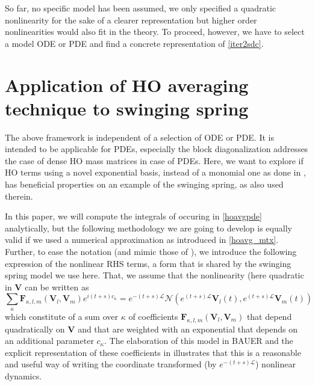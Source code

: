 \documentclass[a4,12pt]{article}
\newcommand{\V}{\mathbf{V}}
\newcommand{\Fu}{\mathbf{F}}
\newcommand{\opL}{\mathcal{L}}
\newcommand{\opN}{\mathcal{N}}
\begin{document}
So far, no specific model has been assumed, we only specified a quadratic nonlinearity for the sake of a clearer representation but higher order nonlinearities would also fit in the theory. To proceed, however, we have to select a model ODE or PDE and find a concrete representation of \eqref{iter2sdc}.


\section{Application of HO averaging technique to swinging spring}

The above framework is independent of a selection of ODE or PDE. It is intended to be applicable for PDEs, especially the block diagonalization addresses the case of dense HO mass matrices in case of PDEs. Here, we want to explore if HO terms using a novel exponential basis, instead of a monomial one as done in \cite{Bauer22}, has beneficial properties on an example of the swinging spring, as also used therein.

In this paper, we will compute the integrals of occuring in \eqref{hoavgpde} analytically, but the following methodology we are going to develop is equally valid if we used a numerical approximation as introduced in \eqref{hoavg_mtx}. Further, to ease the notation (and mimic those of \cite{Bauer22}), we introduce the following expression of the nonlinear RHS terms, a form that is shared by the swinging spring model we use here. That, we assume that the nonlinearity (here quadratic in $\V$ can be written as
\begin{equation}
 \sum_{\kappa} \Fu_{\kappa,l,m}(\V_l,\V_m) e^{i {(t + s) c_\kappa} }
  =   e^{-(t+s) \opL} \opN \left(e^{ (t+s) \opL}  {\V_{l}}(t), e^{ (t+s) \opL} {\V_{m}}(t)\right)
\end{equation}
which constitute of a sum over $\kappa$ of coefficients $ \Fu_{\kappa,l,m}(\V_l,\V_m)$ that depend quadratically on $\V$ and that are weighted with an exponential that depends on an additional parameter $c_\kappa$. The elaboration of this model in BAUER and the explicit representation of these coefficients in \cite{Bauer22} illustrates that this is a reasonable and useful way of writing the coordinate transformed (by $e^{-(t+s) \opL}$) nonlinear dynamics.
\end{document}
